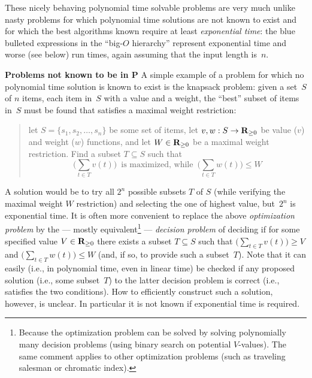 \documentclass[titlepage]{article}
\theoremstyle{definition}
\numberwithin{equation}{subsection}
\numberwithin{remark}{subsection}
\begin{document}
These nicely behaving polynomial time solvable problems are very much unlike nasty problems for which polynomial time solutions are not known to exist and for which the best algorithms known require at least \emph{exponential time}: the blue bulleted expressions in the ``big-$O$ hierarchy'' represent exponential time and worse (see below) run times, again assuming that the input length is~$n$.\\
\par\noindent
{\bf{Problems not known to be in {\bf{P}}}}
A simple example of a problem for which no polynomial time solution is known to exist is the knapsack problem: given a set~$S$ of $n$ items, each item in~$S$ with a value and a weight, the ``best'' subset of items in~$S$ must be found that satisfies a maximal weight restriction:
\begin{quote}
let $S=\{s_1,s_2,\ldots,s_n\}$ be some set of items, let $v, w: S\rightarrow{\bf R}_{\ge 0}$ be value ($v$) and weight ($w$) functions, and let $W\in{\bf R}_{\ge 0}$ be a maximal weight restriction. Find a subset $T\subseteq S$ such that $$\Big(\sum_{t\in T}v(t)\Big)\,\,\,\text{is maximized, while}\,\,\,\Big(\sum_{t\in T}w(t)\Big)\le W$$
\end{quote}
A solution would be to try all $2^n$ possible subsets $T$ of $S$ (while verifying the maximal weight $W$ restriction) and selecting the one of highest value, but~$2^n$ is exponential time.
It is often more convenient to replace the above \emph{optimization problem} by the --- mostly equivalent\footnote{Because the optimization problem can be solved by solving polynomially many decision problems (using binary search on potential $V$-values). The same comment applies to other optimization problems (such as traveling salesman or chromatic index).} --- \emph{decision problem} of deciding if for some specified value $V\in{\bf R}_{\ge 0}$ there exists a subset $T\subseteq S$ such that $\Big(\sum_{t\in T}v(t)\Big)\ge V$ and $\Big(\sum_{t\in T}w(t)\Big)\le W$ (and, if so, to provide such a subset~$T$).
Note that it can easily (i.e., in polynomial time, even in linear time) be checked if any proposed solution (i.e., some subset~$T$) to the latter decision problem is correct (i.e., satisfies the two conditions). How to efficiently construct such a solution, however, is unclear. In particular it is not known if exponential time is required.
\end{document}
